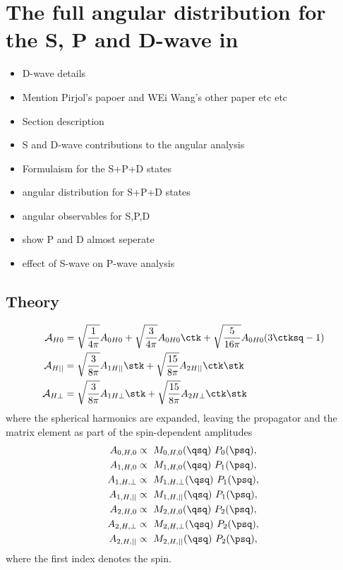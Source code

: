 \chapter{The full angular distribution for the S, P and D-wave in \BdToKpill}
\label{fullangulardistribution}


\begin{itemize}
\item D-wave details
\item Mention Pirjol's papoer and WEi Wang's other paper etc etc
\end{itemize}



\begin{itemize}
\item Section description
\item S and D-wave contributions to the angular analysis
\item Formulaism for the S+P+D states
\item angular distribution for S+P+D states
\item angular observables for S,P,D
\item show P and D almost seperate
\item effect of S-wave on P-wave analysis
\end{itemize}




\section{Theory}

\begin{align}
\label{eq:amps1}
\mathcal{A}_{H0} &= \sqrt{\frac{1}{4\pi}} A_{0H0} + \sqrt{\frac{3}{4\pi}} A_{0H0} \ctk + \sqrt{\frac{5}{16\pi}} A_{0H0} ( 3\ctksq - 1 )    \\
\mathcal{A}_{H||} &= \sqrt{\frac{3}{8\pi}} A_{1H||} \stk + \sqrt{\frac{15}{8\pi}} A_{2H||} \ctk\stk  \\
\mathcal{A}_{H\bot} &= \sqrt{\frac{3}{8\pi}} A_{1H\bot} \stk + \sqrt{\frac{15}{8\pi}} A_{2H\bot} \ctk\stk  
\end{align}
where the spherical harmonics are expanded, leaving the propagator and the matrix element as part of the spin-dependent amplitudes
\begin{equation}
\label{eq:amps2}
\begin{split}
A_{0,H,0} &\propto \  M_{0,H,0} (\qsq) \  P_0(\psq) , \\
A_{1,H,0} &\propto  \  M_{1,H,0} (\qsq)\  P_1(\psq) , \\
A_{1,H,\bot} &\propto  \  M_{1,H,\bot} (\qsq)\  P_1(\psq) , \\
A_{1,H,||} &\propto  \  M_{1,H,||} (\qsq)\ P_1(\psq) , \\ 
A_{2,H,0} &\propto  \  M_{2,H,0} (\qsq)\  P_2(\psq) , \\
A_{2,H,\bot} &\propto  \  M_{2,H,\bot} (\qsq)\  P_2(\psq) , \\
A_{2,H,||} &\propto  \  M_{2,H,||} (\qsq)\ P_2(\psq) , 
\end{split}
\end{equation}
where the first index denotes the spin.



